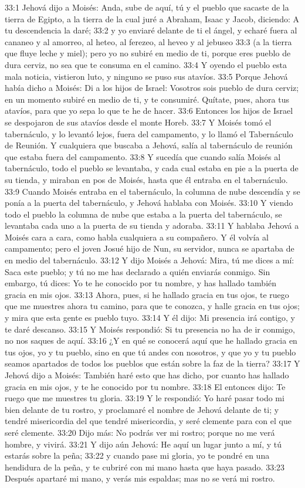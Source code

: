 33:1 Jehová dijo a Moisés: Anda, sube de aquí, tú y el pueblo que sacaste de la tierra de Egipto, a la tierra de la cual juré a Abraham, Isaac y Jacob, diciendo: A tu descendencia la daré; 
33:2 y yo enviaré delante de ti el ángel, y echaré fuera al cananeo y al amorreo, al heteo, al ferezeo, al heveo y al jebuseo 
33:3 (a la tierra que fluye leche y miel); pero yo no subiré en medio de ti, porque eres pueblo de dura cerviz, no sea que te consuma en el camino. 
33:4 Y oyendo el pueblo esta mala noticia, vistieron luto, y ninguno se puso sus atavíos. 
33:5 Porque Jehová había dicho a Moisés: Di a los hijos de Israel: Vosotros sois pueblo de dura cerviz; en un momento subiré en medio de ti, y te consumiré. Quítate, pues, ahora tus atavíos, para que yo sepa lo que te he de hacer. 
33:6 Entonces los hijos de Israel se despojaron de sus atavíos desde el monte Horeb. 
33:7 Y Moisés tomó el tabernáculo, y lo levantó lejos, fuera del campamento, y lo llamó el Tabernáculo de Reunión. Y cualquiera que buscaba a Jehová, salía al tabernáculo de reunión que estaba fuera del campamento. 
33:8 Y sucedía que cuando salía Moisés al tabernáculo, todo el pueblo se levantaba, y cada cual estaba en pie a la puerta de su tienda, y miraban en pos de Moisés, hasta que él entraba en el tabernáculo. 
33:9 Cuando Moisés entraba en el tabernáculo, la columna de nube descendía y se ponía a la puerta del tabernáculo, y Jehová hablaba con Moisés. 
33:10 Y viendo todo el pueblo la columna de nube que estaba a la puerta del tabernáculo, se levantaba cada uno a la puerta de su tienda y adoraba. 
33:11 Y hablaba Jehová a Moisés cara a cara, como habla cualquiera a su compañero. Y él volvía al campamento; pero el joven Josué hijo de Nun, su servidor, nunca se apartaba de en medio del tabernáculo. 
33:12 Y dijo Moisés a Jehová: Mira, tú me dices a mí: Saca este pueblo; y tú no me has declarado a quién enviarás conmigo. Sin embargo, tú dices: Yo te he conocido por tu nombre, y has hallado también gracia en mis ojos. 
33:13 Ahora, pues, si he hallado gracia en tus ojos, te ruego que me muestres ahora tu camino, para que te conozca, y halle gracia en tus ojos; y mira que esta gente es pueblo tuyo. 
33:14 Y él dijo: Mi presencia irá contigo, y te daré descanso. 
33:15 Y Moisés respondió: Si tu presencia no ha de ir conmigo, no nos saques de aquí. 
33:16 ¿Y en qué se conocerá aquí que he hallado gracia en tus ojos, yo y tu pueblo, sino en que tú andes con nosotros, y que yo y tu pueblo seamos apartados de todos los pueblos que están sobre la faz de la tierra? 
33:17 Y Jehová dijo a Moisés: También haré esto que has dicho, por cuanto has hallado gracia en mis ojos, y te he conocido por tu nombre. 
33:18 El entonces dijo: Te ruego que me muestres tu gloria. 
33:19 Y le respondió: Yo haré pasar todo mi bien delante de tu rostro, y proclamaré el nombre de Jehová delante de ti; y tendré misericordia del que tendré misericordia, y seré clemente para con el que seré clemente. 
33:20 Dijo más: No podrás ver mi rostro; porque no me verá hombre, y vivirá. 
33:21 Y dijo aún Jehová: He aquí un lugar junto a mí, y tú estarás sobre la peña; 
33:22 y cuando pase mi gloria, yo te pondré en una hendidura de la peña, y te cubriré con mi mano hasta que haya pasado. 
33:23 Después apartaré mi mano, y verás mis espaldas; mas no se verá mi rostro. 
